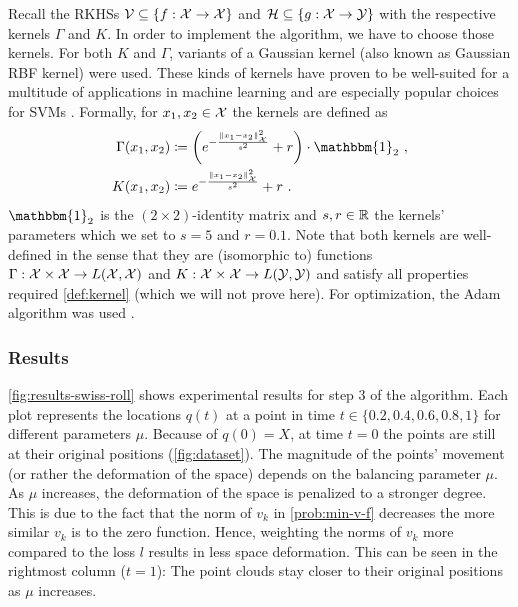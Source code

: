 Recall the RKHSs $\mathcal{V} \subseteq \{f: \mathcal{X} \rightarrow \mathcal{X}\}$ and $\mathcal{H} \subseteq \{g: \mathcal{X} \rightarrow \mathcal{Y}\}$ with the respective kernels $\Gamma$ and $K$.
In order to implement the algorithm, we have to choose those kernels.
For both $K$ and $\Gamma$, variants of a Gaussian kernel (also known as Gaussian RBF kernel) were used.
These kinds of kernels have proven to be well-suited for a multitude of applications in machine learning and are especially popular choices for SVMs \cite{steinwart08}. 
Formally, for $x_1, x_2 \in \mathcal{X}$ the kernels are defined as
\begin{align}
	\Gamma(x_1, x_2) &\coloneqq \left(e^{-\frac{\norm{x_1 - x_2}_\cX^2}{s^2}} + r\right) \cdot \mathbbm{1}_2 \ ,\\
	K(x_1, x_2) &\coloneqq e^{-\frac{\norm{x_1 - x_2}_\cX^2}{s^2}} + r \ .
\end{align}
$\mathbbm{1}_2$ is the $(2\times2)$-identity matrix and $s, r \in \mathbb{R}$ the kernels' parameters which we set to $s = 5$ and $r = 0.1$.
Note that both kernels are well-defined in the sense that they are (isomorphic to) functions $\Gamma: \mathcal{X} \times \mathcal{X} \rightarrow L(\mathcal{X}, \mathcal{X})$ and $K: \mathcal{X} \times \mathcal{X} \rightarrow L(\mathcal{Y}, \mathcal{Y})$ and satisfy all properties required \cref{def:kernel} (which we will not prove here).
For optimization, the Adam algorithm was used \cite{kingma17}.

\subsubsection{Results}



\cref{fig:results-swiss-roll} shows experimental results for step 3 of the algorithm.
Each plot represents the locations $q(t)$ at a point in time $t \in \{0.2, 0.4, 0.6, 0.8, 1\}$ for different parameters $\mu$.
Because of $q(0) = X$, at time $t = 0$ the points are still at their original positions (\cref{fig:dataset}).
The magnitude of the points' movement (or rather the deformation of the space) depends on the balancing parameter $\mu$.
As $\mu$ increases, the deformation of the space is penalized to a stronger degree.
This is due to the fact that the norm of $v_k$ in \cref{prob:min-v-f} decreases the more similar $v_k$ is to the zero function.
Hence, weighting the norms of $v_k$ more compared to the loss $l$ results in less space deformation.
This can be seen in the rightmost column ($t=1$):
The point clouds stay closer to their original positions as $\mu$ increases.

